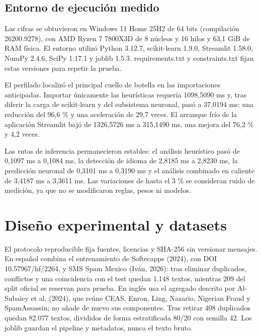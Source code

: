 \documentclass[11pt,a4paper,oneside]{report}
\begin{document}
\subsection{Entorno de ejecución medido}

Las cifras se obtuvieron en Windows 11 Home 25H2 de 64 bits (compilación 26200.9278), con AMD Ryzen 7 7800X3D de 8 núcleos y 16 hilos y 63,1 GiB de RAM física. El entorno utilizó Python 3.12.7, scikit-learn 1.9.0, Streamlit 1.58.0, NumPy 2.4.6, SciPy 1.17.1 y joblib 1.5.3. requirements.txt y constraints.txt fijan estas versiones para repetir la prueba.

El perfilado localizó el principal cuello de botella en las importaciones anticipadas. Importar únicamente las heurísticas requería 1098,5090 ms y, tras diferir la carga de scikit-learn y del subsistema neuronal, pasó a 37,0194 ms: una reducción del 96,6 \% y una aceleración de 29,7 veces. El arranque frío de la aplicación Streamlit bajó de 1326,5726 ms a 315,1490 ms, una mejora del 76,2 \% y 4,2 veces.

Las rutas de inferencia permanecieron estables: el análisis heurístico pasó de 0,1097 ms a 0,1084 ms, la detección de idioma de 2,8185 ms a 2,8230 ms, la predicción neuronal de 0,3101 ms a 0,3190 ms y el análisis combinado en caliente de 3,4187 ms a 3,3611 ms. Las variaciones de hasta el 3 \% se consideran ruido de medición, ya que no se modificaron reglas, pesos ni modelos.

\section{Diseño experimental y datasets}

El protocolo reproducible fija fuentes, licencias y SHA-256 sin versionar mensajes. En español combina el entrenamiento de Softecapps (2024), con DOI 10.57967/hf/2264, y SMS Spam Mexico (Iván, 2026): tras eliminar duplicados, conflictos y una coincidencia con el test quedan 1.148 textos, mientras 209 del split oficial se reservan para prueba. En inglés usa el agregado descrito por Al-Subaiey et al. (2024), que reúne CEAS, Enron, Ling, Nazario, Nigerian Fraud y SpamAssassin; no añade de nuevo sus componentes. Tras retirar 408 duplicados quedan 82.077 textos, divididos de forma estratificada 80/20 con semilla 42. Los joblib guardan el pipeline y metadatos, nunca el texto bruto.
\end{document}
